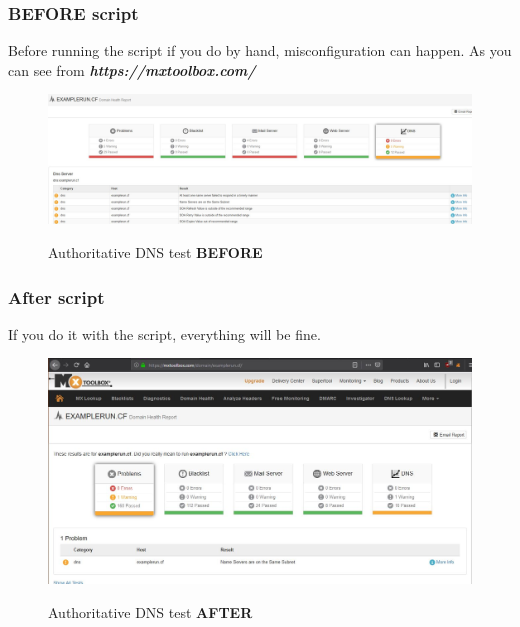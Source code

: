 \subsubsection{BEFORE script}
Before running the script if you do by hand, misconfiguration can happen. As you can see from \textbf{\textit{https://mxtoolbox.com/}}
\begin{figure}[H]
	\centering
	\includegraphics[width=1\linewidth]{pics/mxtool_before_test}
	\label{fig:mxtoolbeforetest}
			\caption{Authoritative DNS test \textbf{BEFORE}}
\end{figure}

\subsubsection{After script}
If you do it with the script, everything will be fine.
\begin{figure}[H]
	\centering
	\includegraphics[width=1\linewidth]{pics/mxtool_after_test}
	\label{fig:mxtoolaftertest}
			\caption{Authoritative DNS test \textbf{AFTER}}
\end{figure}
\newpage
